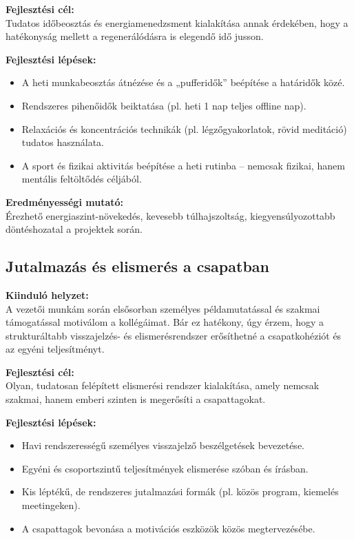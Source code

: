 \textbf{Fejlesztési cél:} \\
Tudatos időbeosztás és energiamenedzsment kialakítása annak érdekében, hogy a hatékonyság mellett 
a regenerálódásra is elegendő idő jusson.

\textbf{Fejlesztési lépések:}
\begin{itemize}
    \item A heti munkabeosztás átnézése és a „pufferidők” beépítése a határidők közé.
    \item Rendszeres pihenőidők beiktatása (pl. heti 1 nap teljes offline nap).
    \item Relaxációs és koncentrációs technikák (pl. légzőgyakorlatok, rövid meditáció) tudatos használata.
    \item A sport és fizikai aktivitás beépítése a heti rutinba – nemcsak fizikai, hanem mentális feltöltődés céljából.
\end{itemize}

\textbf{Eredményességi mutató:} \\
Érezhető energiaszint-növekedés, kevesebb túlhajszoltság, kiegyensúlyozottabb döntéshozatal a projektek során.

\subsection{Jutalmazás és elismerés a csapatban}

\textbf{Kiinduló helyzet:} \\
A vezetői munkám során elsősorban személyes példamutatással és szakmai támogatással motiválom a kollégáimat.
Bár ez hatékony, úgy érzem, hogy a strukturáltabb visszajelzés- és elismerésrendszer erősíthetné 
a csapatkohéziót és az egyéni teljesítményt.

\textbf{Fejlesztési cél:} \\
Olyan, tudatosan felépített elismerési rendszer kialakítása, amely nemcsak szakmai, hanem emberi 
szinten is megerősíti a csapattagokat.

\textbf{Fejlesztési lépések:}
\begin{itemize}
    \item Havi rendszerességű személyes visszajelző beszélgetések bevezetése.
    \item Egyéni és csoportszintű teljesítmények elismerése szóban és írásban.
    \item Kis léptékű, de rendszeres jutalmazási formák (pl. közös program, kiemelés meetingeken).
    \item A csapattagok bevonása a motivációs eszközök közös megtervezésébe.
\end{itemize}

